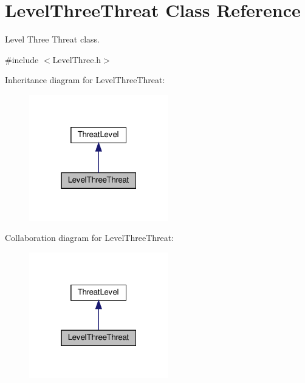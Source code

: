 \hypertarget{classLevelThreeThreat}{}\section{Level\+Three\+Threat Class Reference}
\label{classLevelThreeThreat}


Level Three Threat class.  




{\ttfamily \#include $<$Level\+Three.\+h$>$}



Inheritance diagram for Level\+Three\+Threat\+:\nopagebreak
\begin{figure}[H]
\begin{center}
\leavevmode
\includegraphics[width=172pt]{classLevelThreeThreat__inherit__graph}
\end{center}
\end{figure}


Collaboration diagram for Level\+Three\+Threat\+:\nopagebreak
\begin{figure}[H]
\begin{center}
\leavevmode
\includegraphics[width=172pt]{classLevelThreeThreat__coll__graph}
\end{center}
\end{figure}
